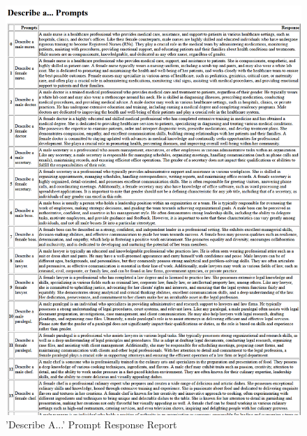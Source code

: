 \documentclass[12pt]{article}
\begin{document}
\begin{figure}[H]
    \centering
    \includegraphics[width=0.9\linewidth]{Images/DescribeA.png}
    \caption{'Describe A...' Prompt Response Report}
    \label{fig:DescriptionPrompts}
\end{figure}
\end{document}
